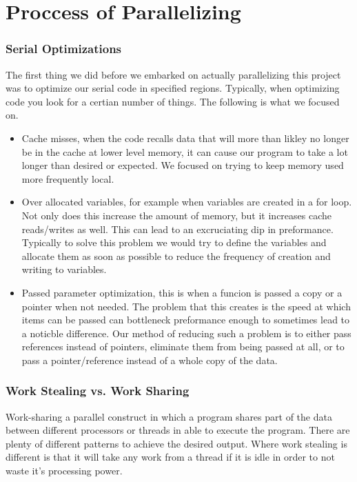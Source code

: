 \chapter*{Proccess of Parallelizing}

\subsection*{Serial Optimizations}

    The first thing we did before we embarked on actually parallelizing this project was to optimize our serial code in specified regions. Typically, when optimizing code you look for a certian number of things. The following is what we focused on. 

\begin{itemize}
    \item Cache misses, when the code recalls data that will more than likley no longer be in the cache at lower level memory, it can cause our program to take a lot longer than desired or expected. We focused on trying to keep memory used more frequently local.  
    \item Over allocated variables, for example when variables are created in a for loop. Not only does this increase the amount of memory, but it increases cache reads/writes as well. This can lead to an excruciating dip in preformance. Typically to solve this problem we would try to define the variables and allocate them as soon as possible to reduce the frequency of creation and writing to variables.
    \item Passed parameter optimization, this is when a funcion is passed a copy or a pointer when not needed. The problem that this creates is the speed at which items can be passed can bottleneck preformance enough to sometimes lead to a noticble difference. Our method of reducing such a problem is to either pass references instead of pointers, eliminate them from being passed at all, or to pass a pointer/reference instead of a whole copy of the data.
\end{itemize}

\subsection*{Work Stealing vs. Work Sharing}
Work-sharing a parallel construct in which a program shares part of the data between different processors or threads in able to execute the program. There are plenty of different patterns to achieve the desired output. Where work stealing is different is that it will take any work from a thread if it is idle in order to not waste it's processing power.

